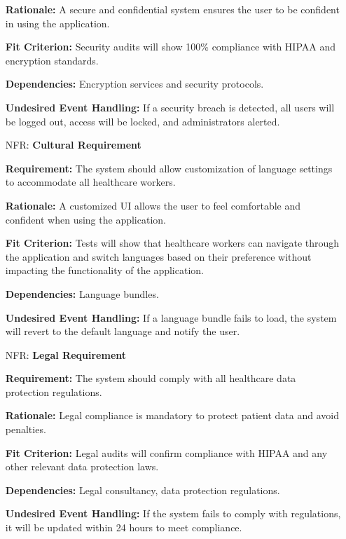 \documentclass[12pt]{article}
\newcounter{nfrnum} %
\begin{document}
\begin{itemize}
    \textbf{Rationale:} A secure and confidential system ensures the user to be confident in using the application.

    \textbf{Fit Criterion:} Security audits will show 100\% compliance with HIPAA and encryption standards.  

    \textbf{Dependencies:} Encryption services and security protocols.  

    \textbf{Undesired Event Handling:} If a security breach is detected, all users will be logged out, access will be locked, and administrators alerted.

\item[NFR\refstepcounter{nfrnum}\thenfrnum \label{NFR_Cultural}:] \textbf{Cultural Requirement}

    \textbf{Requirement:} The system should allow customization of language settings to accommodate all healthcare workers.

    \textbf{Rationale:} A customized UI allows the user to feel comfortable and confident when using the application.

    \textbf{Fit Criterion:} Tests will show that healthcare workers can navigate through the application and switch languages based on their preference without impacting the functionality of the application.

    \textbf{Dependencies:} Language bundles.  

    \textbf{Undesired Event Handling:} If a language bundle fails to load, the system will revert to the default language and notify the user.

\item[NFR\refstepcounter{nfrnum}\thenfrnum \label{NFR_Legal}:] \textbf{Legal Requirement}

    \textbf{Requirement:} The system should comply with all healthcare data protection regulations. 

    \textbf{Rationale:} Legal compliance is mandatory to protect patient data and avoid penalties.  

    \textbf{Fit Criterion:} Legal audits will confirm compliance with HIPAA and any other relevant data protection laws.  

    \textbf{Dependencies:} Legal consultancy, data protection regulations.  

    \textbf{Undesired Event Handling:} If the system fails to comply with regulations, it will be updated within 24 hours to meet compliance.

\end{itemize}
\end{document}
